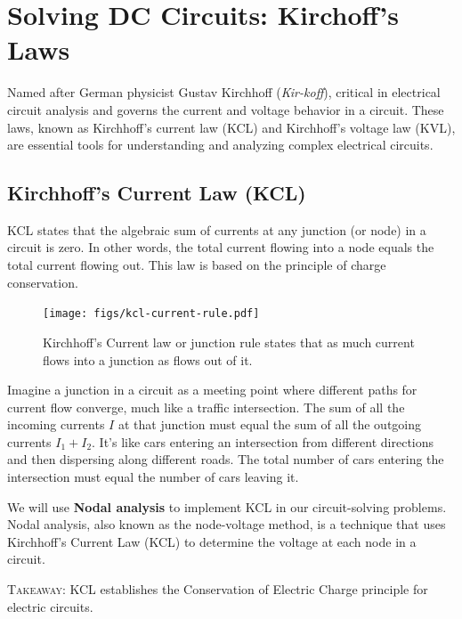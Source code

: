 \documentclass[12pt,b4paper]{article}
\begin{document}
\section{Solving DC Circuits: Kirchoff's Laws}
Named after German physicist Gustav Kirchhoff (\textit{Kir-koff}), critical in electrical circuit analysis and governs the current and voltage behavior in a circuit. These laws, known as Kirchhoff's current law (KCL) and Kirchhoff's voltage law (KVL), are essential tools for understanding and analyzing complex electrical circuits.
\subsection{Kirchhoff's Current Law (KCL)}
KCL states that the algebraic sum of currents at any junction (or node) in a circuit is zero. In other words, the total current flowing into a node equals the total current flowing out. This law is based on the principle of charge conservation.
\begin{figure}[H]
    \centering
    \texttt{[image: figs/kcl-current-rule.pdf]}
    \caption{Kirchhoff’s Current law or junction rule states that as much current flows into a junction as flows out of it.}
    \label{fig:kcl-def}
\end{figure}
Imagine a junction in a circuit as a meeting point where different paths for current flow converge, much like a traffic intersection. The sum of all the incoming currents $I$ at that junction must equal the sum of all the outgoing currents $I_1+I_2$. It's like cars entering an intersection from different directions and then dispersing along different roads. The total number of cars entering the intersection must equal the number of cars leaving it.

We will use \textbf{Nodal analysis} to implement KCL in our circuit-solving problems. Nodal analysis, also known as the node-voltage method, is a technique that uses Kirchhoff's Current Law (KCL) to determine the voltage at each node in a circuit.

\textsc{Takeaway}: KCL establishes the Conservation of Electric Charge principle for electric circuits.
\end{document}
